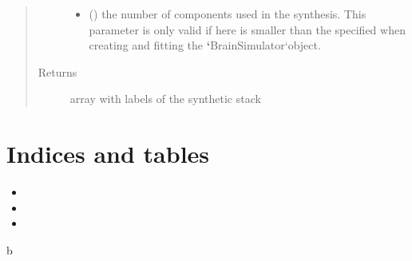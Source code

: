 \documentclass[letterpaper,10pt,english]{sphinxmanual}
\begin{document}
\begin{fulllineitems}
\begin{fulllineitems}
\begin{quote}
\begin{description}
\begin{itemize}
\item {} 
 () \textendash{} the number of components used in the synthesis. This parameter is only valid if  here is smaller than the  specified when creating and fitting the {\color{red}\bfseries{}{}`}BrainSimulator{}`object.

\end{itemize}

\item[{Returns}] \leavevmode
array with labels of the synthetic stack

\end{description}\end{quote}

\end{fulllineitems}


\end{fulllineitems}



\chapter{Indices and tables}
\label{\detokenize{index:welcome-to-brainsimulator-s-documentation}}\label{\detokenize{index:indices-and-tables}}\begin{itemize}
\item {} 

\item {} 

\item {} 

\end{itemize}


\renewcommand{\indexname}{Python Module Index}
\begin{sphinxtheindex}
\def\bigletter#1{{\Large\sffamily#1}\nopagebreak\vspace{1mm}}
\bigletter{b}
\item {}
\end{sphinxtheindex}

\renewcommand{\indexname}{Index}
\printindex
\end{document}
